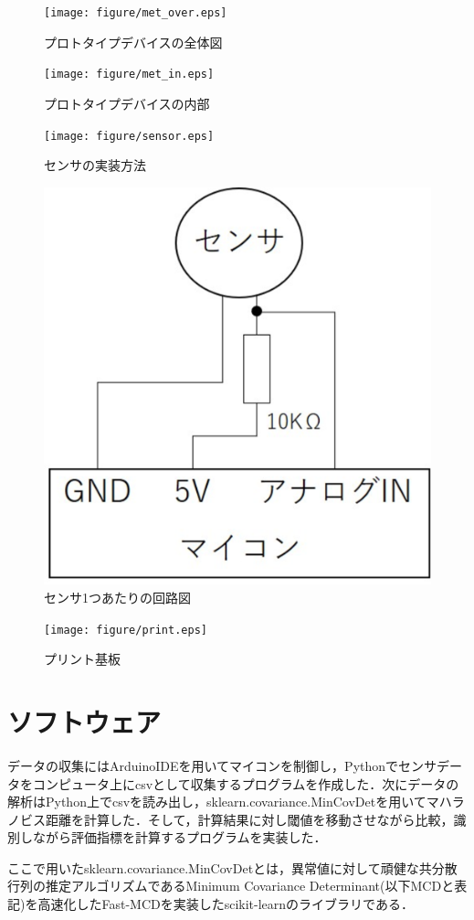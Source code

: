 \begin{figure}[!t]
  \begin{center}
    \texttt{[image: figure/met\_over.eps]}
  \end{center}
  \caption{プロトタイプデバイスの全体図}
  \label{met_over}
\end{figure}

\begin{figure}[!t]
  \begin{center}
    \texttt{[image: figure/met\_in.eps]}
  \end{center}
  \caption{プロトタイプデバイスの内部}
  \label{met_in}
\end{figure}

\begin{figure}[!t]
  \begin{center}
    \texttt{[image: figure/sensor.eps]}
  \end{center}
  \caption{センサの実装方法}
  \label{sensor}
\end{figure}

\begin{figure}[!t]
  \begin{center}
    \includegraphics[width=0.5\linewidth]{figure/circuit.eps}
  \end{center}
  \caption{センサ1つあたりの回路図}
  \label{circuit}
\end{figure}

\begin{figure}[!t]
  \begin{center}
    \texttt{[image: figure/print.eps]}
  \end{center}
  \caption{プリント基板}
  \label{print}
\end{figure}

\section{ソフトウェア}
データの収集にはArduinoIDEを用いてマイコンを制御し，Pythonでセンサデータをコンピュータ上にcsvとして収集するプログラムを作成した．次にデータの解析はPython上でcsvを読み出し，sklearn.covariance.MinCovDetを用いてマハラノビス距離を計算した．そして，計算結果に対し閾値を移動させながら比較，識別しながら評価指標を計算するプログラムを実装した．\par
ここで用いたsklearn.covariance.MinCovDetとは，異常値に対して頑健な共分散行列の推定アルゴリズムであるMinimum Covariance Determinant(以下MCDと表記)を高速化したFast-MCD\cite{fast_mcd}を実装したscikit-learnのライブラリである．